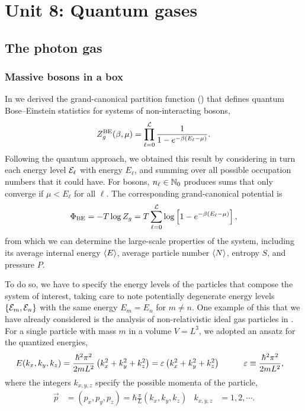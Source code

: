\renewcommand{\thisunit}{MATH327 Unit 8}
\renewcommand{\moddate}{Last modified 17 Mar.~2022}
\setcounter{section}{8}
\setcounter{subsection}{0}
{}
\section*{Unit 8: Quantum gases}
\subsection{\label{sec:photon}The photon gas}
\subsubsection{Massive bosons in a box}
In  we derived the grand-canonical partition function () that defines quantum Bose--Einstein statistics for systems of non-interacting bosons,
\begin{equation*}
  Z_g^{\text{BE}}(\beta, \mu) = \prod_{\ell = 0}^{\mathcal L} \frac{1}{1 - e^{-\beta (E_{\ell} - \mu)}}.
\end{equation*}
Following the quantum approach, we obtained this result by considering in turn each energy level $\mathcal E_{\ell}$ with energy $E_{\ell}$, and summing over all possible occupation numbers that it could have.
For bosons, $n_{\ell} \in \mathbb N_0$ produces sums that only converge if $\mu < E_{\ell}$ for all $\ell$.
The corresponding grand-canonical potential is
\begin{equation*}
  \Phi_{\text{BE}} = -T \log Z_g = T \sum_{\ell = 0}^{\mathcal L} \log\left[1 - e^{-\beta (E_{\ell} - \mu)}\right],
\end{equation*}
from which we can determine the large-scale properties of the system, including its average internal energy $\left\langle E \right\rangle$, average particle number $\left\langle N \right\rangle$, entropy $S$, and pressure $P$.

To do so, we have to specify the energy levels of the particles that compose the system of interest, taking care to note potentially degenerate energy levels $\left\{\mathcal E_m, \mathcal E_n\right\}$ with the same energy $E_m = E_n$ for $m \neq n$.
One example of this that we have already considered is the analysis of non-relativistic ideal gas particles in .
For a single particle with mass $m$ in a volume $V = L^3$, we adopted an ansatz for the quantized energies,
\begin{align}
  \label{eq:nonrel_energy}
  E(k_x, k_y, k_z) & = \frac{\hbar^2 \pi^2}{2mL^2}\left(k_x^2 + k_y^2 + k_z^2\right) = \varepsilon \left(k_x^2 + k_y^2 + k_z^2\right) \qquad &
  \varepsilon & \equiv \frac{\hbar^2 \pi^2}{2mL^2},
\end{align}
where the integers $k_{x, y, z}$ specify the possible momenta of the particle,
\begin{align*}
  \vec p & = (p_x, p_y, p_z) = \hbar \frac{\pi}{L} (k_x, k_y, k_z) &
  k_{x, y, z} & = 1, 2, \cdots.
\end{align*}

